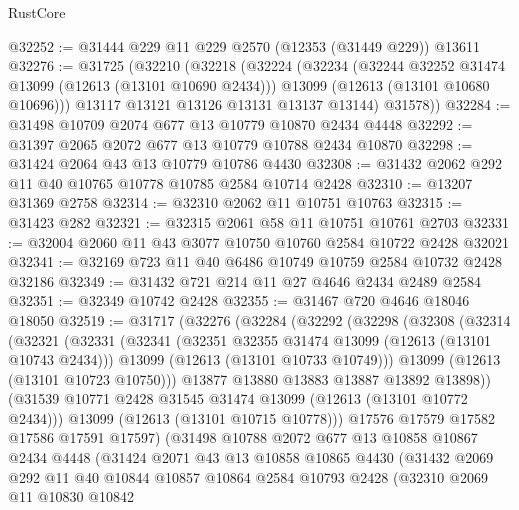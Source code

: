 \begin{lexlean}{RustCore}
\begin{coremodule}
@32252 := @31444 @229 @11 @229 @2570 (@12353 (@31449 @229)) @13611
@32276 := @31725
    (@32210
      (@32218
        (@32224
          (@32234
            (@32244 @32252 @31474 @13099 (@12613 (@13101 @10690 @2434)))
            @13099
            (@12613 (@13101 @10680 @10696)))
          @13117
          @13121
          @13126
          @13131
          @13137
          @13144)
        @31578))
@32284 := @31498 @10709 @2074 @677 @13 @10779 @10870 @2434 @4448
@32292 := @31397 @2065 @2072 @677 @13 @10779 @10788 @2434 @10870
@32298 := @31424 @2064 @43 @13 @10779 @10786 @4430
@32308 := @31432 @2062 @292 @11 @40 @10765 @10778 @10785 @2584 @10714 @2428
@32310 := @13207 @31369 @2758
@32314 := @32310 @2062 @11 @10751 @10763
@32315 := @31423 @282
@32321 := @32315 @2061 @58 @11 @10751 @10761 @2703
@32331 := @32004 @2060 @11 @43 @3077 @10750 @10760 @2584 @10722 @2428 @32021
@32341 := @32169 @723 @11 @40 @6486 @10749 @10759 @2584 @10732 @2428 @32186
@32349 := @31432 @721 @214 @11 @27 @4646 @2434 @2489 @2584
@32351 := @32349 @10742 @2428
@32355 := @31467 @720 @4646 @18046 @18050
@32519 := @31717
    (@32276
      (@32284
        (@32292
          (@32298
            (@32308
              (@32314
                (@32321
                  (@32331
                    (@32341
                      (@32351 @32355 @31474 @13099 (@12613 (@13101 @10743 @2434)))
                      @13099
                      (@12613 (@13101 @10733 @10749)))
                    @13099
                    (@12613 (@13101 @10723 @10750)))
                  @13877
                  @13880
                  @13883
                  @13887
                  @13892
                  @13898))
              (@31539 @10771 @2428 @31545 @31474 @13099 (@12613 (@13101 @10772 @2434)))
              @13099
              (@12613 (@13101 @10715 @10778)))
            @17576
            @17579
            @17582
            @17586
            @17591
            @17597)
          (@31498
            @10788
            @2072
            @677
            @13
            @10858
            @10867
            @2434
            @4448
            (@31424
              @2071
              @43
              @13
              @10858
              @10865
              @4430
              (@31432
                @2069
                @292
                @11
                @40
                @10844
                @10857
                @10864
                @2584
                @10793
                @2428
                (@32310
                  @2069
                  @11
                  @10830
                  @10842

\end{coremodule}
\end{lexlean}
